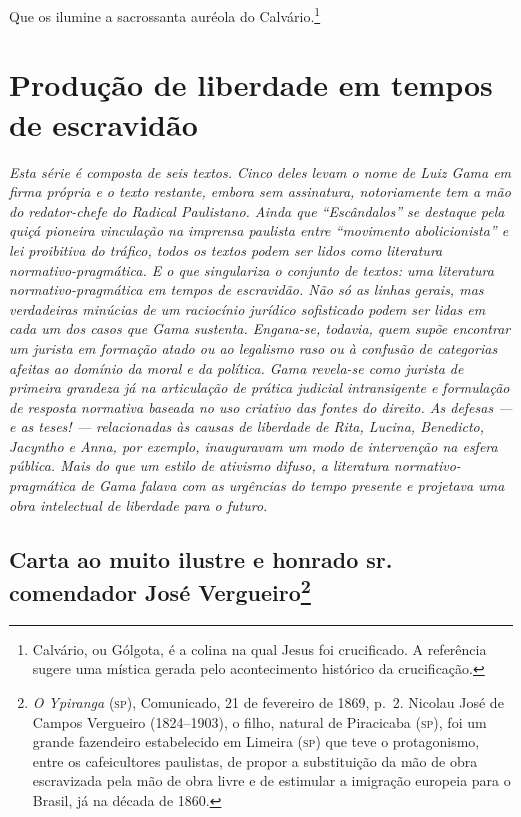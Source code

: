 Que os ilumine a sacrossanta auréola do Calvário.\footnote{Calvário,
  ou Gólgota, é a colina na qual Jesus foi crucificado. A referência
  sugere uma mística gerada pelo acontecimento histórico da
  crucificação.}

\part{Produção de liberdade em tempos de escravidão} %

\begin{argumento}\itshape
Esta série é composta de seis textos. Cinco deles levam o nome de Luiz
Gama em firma própria e o texto restante, embora sem assinatura,
notoriamente tem a mão do redator-chefe do \textnormal{Radical Paulistano}.
Ainda que ``Escândalos'' se destaque pela quiçá pioneira vinculação
na imprensa paulista entre ``movimento abolicionista'' e lei proibitiva do
tráfico, todos os textos podem ser lidos como literatura
normativo-pragmática. E o que singulariza o conjunto de textos: uma
literatura normativo-pragmática em tempos de escravidão. Não só as
linhas gerais, mas verdadeiras minúcias de um raciocínio jurídico
sofisticado podem ser lidas em cada um dos casos que Gama sustenta.
Engana-se, todavia, quem supõe encontrar um jurista em formação atado ou
ao legalismo raso ou à confusão de categorias afeitas ao domínio da
moral e da política. Gama revela-se como jurista de primeira grandeza já
na articulação de prática judicial intransigente e formulação de
resposta normativa baseada no uso criativo das fontes do direito. As
defesas --- e as teses! --- relacionadas às causas de liberdade de Rita,
Lucina, Benedicto, Jacyntho e Anna, por exemplo, inauguravam um modo de
intervenção na esfera pública. Mais do que um estilo de ativismo difuso,
a literatura normativo-pragmática de Gama falava com as urgências do
tempo presente e projetava uma obra intelectual de liberdade para o
futuro.
\end{argumento}

\chapter{Carta ao muito ilustre e honrado sr.\,comendador José
Vergueiro\footnote{\emph{O Ypiranga} (\textsc{sp}), Comunicado, 21 de fevereiro de 1869,
  p.~2. Nicolau José de Campos Vergueiro (1824--1903), o filho, natural
  de Piracicaba (\textsc{sp}), foi um grande fazendeiro estabelecido em Limeira
  (\textsc{sp}) que teve o protagonismo, entre os cafeicultores paulistas, de
  propor a substituição da mão de obra escravizada pela mão de obra
  livre e de estimular a imigração europeia para o Brasil, já na década
  de 1860.}}


